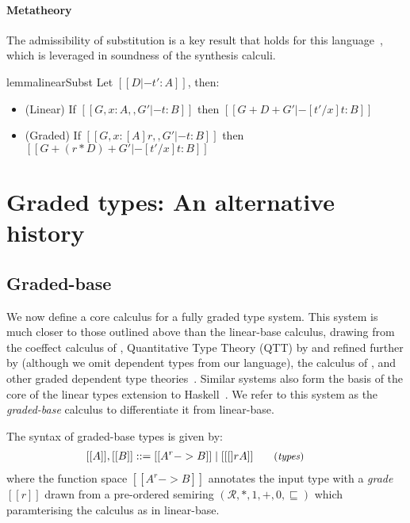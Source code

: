 \paragraph{Metatheory}
The admissibility of substitution is a key result that holds
for this language~\cite{DBLP:journals/pacmpl/OrchardLE19}, which is
leveraged in soundness of the synthesis calculi.
%
\begin{restatable}{lemma}{linearSubst}
Let $[[ D |- t' : A]]$, then:
\label{lemma:substitution}
\begin{itemize}[leftmargin=1em]
\item (Linear) \hspace{0.04em} If $[[ {G, x : A}
    ,, { G' } |- t : B]]$ then $[[ G + D + G' |-
[ t' / x ] t : B ]]$
\item (Graded) If $[[ {G, x : [A] r} ,, { G' } |- t : B]]$
then $[[ G + (r * D) + G' |- [ t' / x ] t : B ]]$
\end{itemize}
\end{restatable}

\section{Graded types: An alternative history}

\subsection{Graded-base}
\label{sec:graded-base}

We now define a core calculus for a fully graded type system. This system is much closer
to those outlined above than the linear-base calculus, drawing from the coeffect calculus of \citet{petricek2014coeffects}, Quantitative Type Theory (QTT) by \citet{McBride2016} and refined further by \citet{quantitative-type-theory} (although we omit dependent types from our language), the calculus of \citet{DBLP:journals/pacmpl/AbelB20}, and other graded dependent type theories~\cite{quantitative-type-theory,DBLP:conf/esop/MoonEO21}. Similar
systems also form the basis of the core of the linear types extension to
Haskell~\cite{DBLP:journals/pacmpl/BernardyBNJS18}. We refer to this system as
the \textit{graded-base} calculus to differentiate it from linear-base.

The syntax of graded-base types is given by:
\begin{align*}
\hspace{-0.9em}[[ A ]] , [[ B ]] & ::=
       [[ A ^ r -> B ]]
  \mid [[ [] r A ]]
{\small{\tag{\textit{types}}}}
\end{align*}
where the function space $[[ A ^ r -> B ]]$ annotates the input type with a \emph{grade} $[[ r ]]$
drawn from a pre-ordered semiring
$(\mathcal{R}, {\ast}, {1}, {+}, {0}, \sqsubseteq)$ which paramterising the
calculus as in linear-base.

